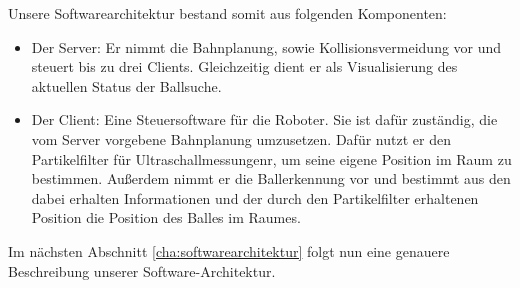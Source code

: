 Unsere Softwarearchitektur bestand somit aus folgenden Komponenten:
\begin{itemize}
\item Der Server: Er nimmt die Bahnplanung, sowie Kollisionsvermeidung
  vor und steuert bis zu drei Clients. Gleichzeitig dient er als
  Visualisierung des aktuellen Status der Ballsuche.
\item Der Client: Eine Steuersoftware für die Roboter. Sie ist dafür
  zuständig, die vom Server vorgebene Bahnplanung umzusetzen. Dafür
  nutzt er den Partikelfilter für Ultraschallmessungenr, um seine eigene Position im Raum
  zu bestimmen. Außerdem nimmt er die Ballerkennung vor
  und bestimmt aus den dabei erhalten Informationen und der durch den
  Partikelfilter erhaltenen Position die Position des Balles im Raumes.
\end{itemize}
Im nächsten Abschnitt \ref{cha:softwarearchitektur} folgt nun eine genauere Beschreibung unserer
Software-Architektur.

